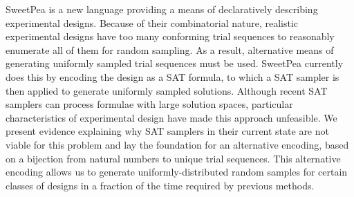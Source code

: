 
SweetPea is a new language providing a means of declaratively describing experimental designs. Because of their combinatorial nature, realistic experimental designs have too many conforming trial sequences to reasonably enumerate all of them for random sampling. As a result, alternative means of generating uniformly sampled trial sequences must be used. SweetPea currently does this by encoding the design as a SAT formula, to which a SAT sampler is then applied to generate uniformly sampled solutions. Although recent SAT samplers can process formulae with large solution spaces, particular characteristics of experimental design have made this approach unfeasible. We present evidence explaining why SAT samplers in their current state are not viable for this problem and lay the foundation for an alternative encoding, based on a bijection from natural numbers to unique trial sequences. This alternative encoding allows us to generate uniformly-distributed random samples for certain classes of designs in a fraction of the time required by previous methods.